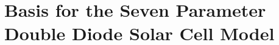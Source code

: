 \chapter{Basis for the Seven Parameter Double Diode Solar Cell Model}\label{appendix:seven_parameter_solar_cell}
